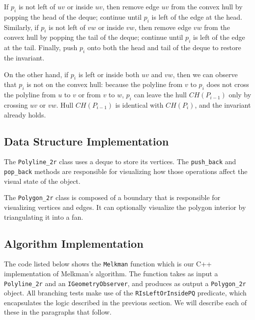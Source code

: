 If $p_i$ is not left of $uv$ or inside $uv$, then remove edge $uv$ from the
convex hull by popping the head of the deque; continue until $p_i$ is left of
the edge at the head. Similarly, if $p_i$ is not left of $vw$ or inside $vw$,
then remove edge $vw$ from the convex hull by popping the tail of the deque;
continue until $p_i$ is left of the edge at the tail. Finally, push $p_i$ onto
both the head and tail of the deque to restore the invariant.

On the other hand, if $p_i$ is left or inside both $uv$ and $vw$, then we can 
observe that $p_i$ is not on the convex hull: because the polyline from $v$ to
$p_i$ does not cross the polyline from $u$ to $v$ or from $v$ to $w$, $p_i$ can
leave the hull $CH(P_{i-1})$ only by crossing $uv$ or $vw$. Hull $CH(P_{i-1})$
is identical with $CH(P_i)$, and the invariant already holds.


\subsection{Data Structure Implementation}

The \texttt{Polyline\_2r} class uses a deque to store its vertices. The
\texttt{push\_back} and \texttt{pop\_back} methods are responsible for
visualizing how those operations affect the visual state of the object.





The \texttt{Polygon\_2r} class is composed of a  boundary
that is responsible for visualizing vertices and edges. It can optionally
visualize the polygon interior by triangulating it into a fan.  

  
 

\subsection{Algorithm Implementation}

The code listed below shows the \texttt{Melkman} function which is our C++
implementation of Melkman's algorithm. The function takes as input a
\texttt{Polyline\_2r} and an \texttt{IGeometryObserver}, and produces as output
a \texttt{Polygon\_2r} object. All branching tests make use of the
\texttt{RIsLeftOrInsidePQ} predicate, which encapsulates the logic described in
the previous section. We will describe each of these in the paragraphs that
follow.
 
